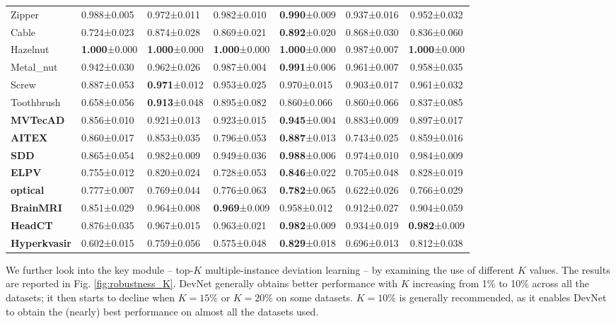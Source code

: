 \documentclass[10pt,journal,compsoc]{IEEEtran}
\begin{document}
\begin{table}[htbp]
{\begin{tabular}{p{1.35cm}p{1.2cm}p{1.2cm}p{1.25cm}p{1.3cm}|p{1.2cm}c}
    Zipper  & 0.988±0.005 & 0.972±0.011 & 0.982±0.010 & \textbf{0.990}±0.009 & 0.937±0.016 & 0.952±0.032 \\
    Cable & 0.724±0.023 & 0.874±0.028  & 0.869±0.021 & \textbf{0.892}±0.020 & 0.868±0.030 & 0.836±0.060 \\
    Hazelnut & \textbf{1.000}±0.000 & \textbf{1.000}±0.000 & \textbf{1.000}±0.000 & \textbf{1.000}±0.000 & 0.987±0.007 & \textbf{1.000}±0.000 \\
    Metal\_nut & 0.942±0.030 & 0.962±0.026  & 0.987±0.004 & \textbf{0.991}±0.006 & 0.961±0.007 & 0.958±0.035 \\
    Screw & 0.887±0.053 & \textbf{0.971}±0.012  & 0.953±0.025 & 0.970±0.015 & 0.903±0.017 & 0.961±0.032 \\
    Toothbrush & 0.658±0.056 & \textbf{0.913}±0.048  & 0.895±0.082 & 0.860±0.066 & 0.860±0.066 & 0.837±0.085 \\\hline
    \textbf{MVTecAD}& 0.856±0.010 & 0.921±0.013  & 0.923±0.015 & \textbf{0.945}±0.004 & 0.883±0.009 & 0.897±0.017 \\
    \textbf{AITEX} & 0.860±0.017 & 0.853±0.035  & 0.796±0.053 & \textbf{0.887}±0.013 & 0.743±0.025 & 0.859±0.016 \\
    \textbf{SDD}  & 0.865±0.054 & 0.982±0.009  & 0.949±0.036 & \textbf{0.988}±0.006 & 0.974±0.010 & 0.984±0.009 \\
    \textbf{ELPV} & 0.755±0.012 & 0.820±0.024  & 0.728±0.053 & \textbf{0.846}±0.022 & 0.705±0.048 & 0.828±0.019 \\
    \textbf{optical}  & 0.777±0.007 & 0.769±0.044 & 0.776±0.063 & \textbf{0.782}±0.065 & 0.622±0.026 & 0.766±0.029 \\
    \textbf{BrainMRI} & 0.851±0.029 & 0.964±0.008 & \textbf{0.969}±0.009 & 0.958±0.012 & 0.912±0.027 & 0.904±0.059 \\
    \textbf{HeadCT} & 0.876±0.035 & 0.967±0.015  & 0.963±0.021 & \textbf{0.982}±0.009 & 0.934±0.019 & \textbf{0.982}±0.009 \\
    \textbf{Hyperkvasir} & 0.602±0.015 & 0.759±0.056  & 0.575±0.048 & \textbf{0.829}±0.018 & 0.696±0.013 & 0.812±0.038 \\\hline
    \end{tabular}}
  \label{tab:ablation_image}\end{table}


We further look into the key module -- top-$K$ multiple-instance deviation learning -- by examining the use of different $K$ values. The results are reported in Fig. \ref{fig:robustness_K}. DevNet generally obtains better performance with $K$ increasing from 1\% to 10\% across all the datasets; it then starts to decline when $K=15\%$ or $K=20\%$ on some datasets. $K=10\%$ is generally recommended, as it enables DevNet to obtain the (nearly) best performance on almost all the datasets used.
\end{document}
